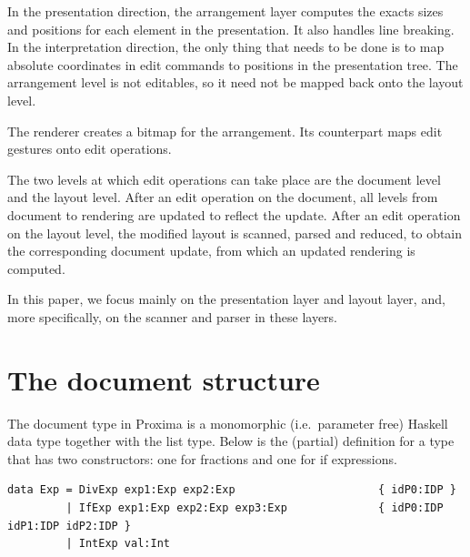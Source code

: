 \documentclass[12pt]{article}
\begin{document}
\noindent In the presentation direction, the arrangement layer computes the exacts sizes and positions for each element in the presentation. It also handles line breaking. In the interpretation direction, the only thing that needs to be done is to map absolute coordinates in edit commands to positions in the presentation tree. The arrangement level is not editables, so it need not be mapped back onto the layout level.

\noindent The renderer creates a bitmap for the arrangement. Its counterpart maps edit gestures onto edit operations.


The two levels at which edit operations can take place are the document level and the layout level. After an edit operation on the document, all levels from document to rendering are updated to reflect the update. After an edit operation on the layout level, the modified layout is scanned, parsed and reduced, to obtain the corresponding document update, from which an updated rendering is computed. 

In this paper, we focus mainly on the presentation layer and layout layer, and, more specifically, on the scanner and parser in these layers.


%
\section{The document structure}\label{sect:document}
%

The document type in Proxima is a monomorphic (i.e.\ parameter free) Haskell data type together with the list type. Below is the (partial) definition for a type  that has two constructors: one for fractions and one for if expressions.

\begin{footnotesize}
\begin{verbatim}
data Exp = DivExp exp1:Exp exp2:Exp                      { idP0:IDP }
         | IfExp exp1:Exp exp2:Exp exp3:Exp              { idP0:IDP idP1:IDP idP2:IDP }
         | IntExp val:Int
\end{verbatim}
\end{footnotesize}
\end{document}
